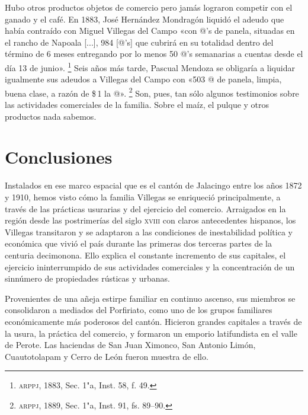 \documentclass[14pt,twoside,final]{extbook} %
\let\oldfootnote\footnote
\renewcommand\footnote[1]{%
\oldfootnote{\hspace{1mm}#1}}
\begin{document}
Hubo otros productos objetos de comercio pero jamás lograron competir con el ganado y el café. En 1883, José Hernández Mondragón liquidó el adeudo que había contraído con Miguel Villegas del Campo «con @'s de panela, situadas en el rancho de Napoala [...], 984 [@'s] que cubrirá en su totalidad dentro del término de 6 meses entregando por lo menos 50 @'s semanarias a cuentas desde el día 13 de junio».\footnote{\textsc{arppj}, 1883, Sec. 1"a, Inst. 58, f. 49.} Seis años más tarde, Pascual Mendoza se obligaría a liquidar igualmente sus adeudos a Villegas del Campo con «503 @ de panela, limpia, buena clase, a razón de \$\,1 la @».\footnote{\textsc{arppj}, 1889, Sec. 1"a, Inst. 91, fs. 89--90.} Son, pues, tan sólo algunos testimonios sobre las actividades comerciales de la familia. Sobre el maíz, el pulque y otros productos nada sabemos.
\chapter*{Conclusiones}
\label{ch:conclusiones}
\thispagestyle{empty}
\pagestyle{fancy}
\fancyhf{} %
\fancyhead[RO,LE]{\iffloatpage{}{\thepage}}
\renewcommand\headrulewidth{\iffloatpage{0pt}{0pt}}
Instalados en ese marco espacial que es el cantón de Jalacingo entre los años 1872 y 1910, hemos visto cómo la familia Villegas se enriqueció principalmente, a través de las prácticas usurarias y del ejercicio del comercio. Arraigados en la región desde las postrimerías del siglo \textsc{xviii} con claros antecedentes hispanos, los Villegas transitaron y se adaptaron a las condiciones de inestabilidad política y económica que vivió el país durante las primeras dos terceras partes de la centuria decimonona. Ello explica el constante incremento de sus capitales, el ejercicio ininterrumpido de sus actividades comerciales y la concentración de un sinnúmero de propiedades rústicas y urbanas.

Provenientes de una añeja estirpe familiar en continuo ascenso, sus miembros se consolidaron a mediados del Porfiriato, como uno de los grupos familiares económicamente más poderosos del cantón. Hicieron grandes capitales a través de la usura, la práctica del comercio, y formaron un emporio latifundista en el valle de Perote. Las haciendas de San Juan Ximonco, San Antonio Limón, Cuautotolapam y Cerro de León fueron muestra de ello.
\end{document}
